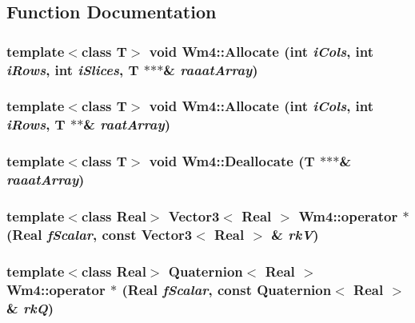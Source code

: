 \subsection{Function Documentation}
\subsubsection{\setlength{\rightskip}{0pt plus 5cm}template$<$class T$>$ void Wm4::Allocate (int {\em i\-Cols}, int {\em i\-Rows}, int {\em i\-Slices}, T $\ast$$\ast$$\ast$\& {\em raaat\-Array})}\label{namespaceWm4_b57559d9025704099f8b09cd0895e7ce}


\subsubsection{\setlength{\rightskip}{0pt plus 5cm}template$<$class T$>$ void Wm4::Allocate (int {\em i\-Cols}, int {\em i\-Rows}, T $\ast$$\ast$\& {\em raat\-Array})}\label{namespaceWm4_2a09d8fdea16940ce61e71566784929f}


\subsubsection{\setlength{\rightskip}{0pt plus 5cm}template$<$class T$>$ void Wm4::Deallocate (T $\ast$$\ast$$\ast$\& {\em raaat\-Array})}\label{namespaceWm4_fa698db75b487d4ac7b80f2cfa1603ff}


\subsubsection{\setlength{\rightskip}{0pt plus 5cm}template$<$class Real$>$ {\bf Vector3}$<$ Real $>$ Wm4::operator $\ast$ (Real {\em f\-Scalar}, const Vector3$<$ Real $>$ \& {\em rk\-V})\hspace{0.3cm}{\tt  [inline]}}\label{namespaceWm4_b7c54563bf1a694a03e0dd4e76412628}


\subsubsection{\setlength{\rightskip}{0pt plus 5cm}template$<$class Real$>$ {\bf Quaternion}$<$ Real $>$ Wm4::operator $\ast$ (Real {\em f\-Scalar}, const Quaternion$<$ Real $>$ \& {\em rk\-Q})\hspace{0.3cm}{\tt  [inline]}}\label{namespaceWm4_489c92bd0ac137ef6ad05c6f60b76caf}


